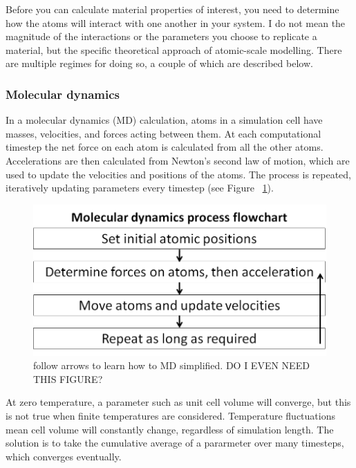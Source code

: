 Before you can calculate material properties of interest, you need to determine how the atoms will interact with one another in your system. I do not mean the magnitude of the interactions or the parameters you choose to replicate a material, but the specific theoretical approach of atomic-scale modelling. There are multiple regimes for doing so, a couple of which are described below.

\subsubsection{Molecular dynamics}

In a molecular dynamics (MD) calculation, atoms in a simulation cell have masses, velocities, and forces acting between them. At each computational timestep the net force on each atom is calculated from all the other atoms. Accelerations are then calculated from Newton's second law of motion, which are used to update the velocities and positions of the atoms. The process is repeated, iteratively updating parameters every timestep (see Figure~ \ref{fig:md_flow}). 

\begin{figure}[h!]
\includegraphics[width=\linewidth]{Figures/md_flowchart.png}
\caption[MD process flowchart draft]{follow arrows to learn how to MD simplified. DO I EVEN NEED THIS FIGURE?}
\label{fig:md_flow}
\end{figure}

At zero temperature, a parameter such as unit cell volume will converge, but this is not true when finite temperatures are considered. Temperature fluctuations mean cell volume will constantly change, regardless of simulation length. The solution is to take the cumulative average of a pararmeter over many timesteps, which converges eventually.

